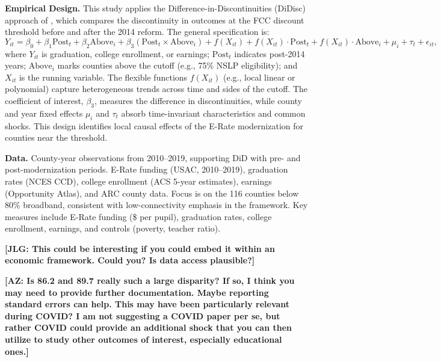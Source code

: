 \textbf{Empirical Design.} This study applies the Difference-in-Discontinuities (DiDisc) approach of \citet{grembiFiscalRulesMatter2016}, which compares the discontinuity in outcomes at the FCC discount threshold before and after the 2014 reform. The general specification is:
\[
Y_{it} = \beta_0 + \beta_1 \text{Post}_t + \beta_2 \text{Above}_i + \beta_3 (\text{Post}_t \times \text{Above}_i) 
+ f(X_{it}) + f(X_{it}) \cdot \text{Post}_t + f(X_{it}) \cdot \text{Above}_i 
+ \mu_i + \tau_t + \epsilon_{it},
\]
where $Y_{it}$ is graduation, college enrollment, or earnings; $\text{Post}_t$ indicates post-2014 years; $\text{Above}_i$ marks counties above the cutoff (e.g., 75\% NSLP eligibility); and $X_{it}$ is the running variable. The flexible functions $f(X_{it})$ (e.g., local linear or polynomial) capture heterogeneous trends across time and sides of the cutoff. The coefficient of interest, $\beta_3$, measures the difference in discontinuities, while county and year fixed effects $\mu_i$ and $\tau_t$ absorb time-invariant characteristics and common shocks. This design identifies local causal effects of the E-Rate modernization for counties near the threshold.


\textbf{Data.} County-year observations from 2010–2019, supporting DiD with pre- and post-modernization periods. E-Rate funding (USAC, 2010–2019), graduation rates (NCES CCD), college enrollment (ACS 5-year estimates), earnings (Opportunity Atlas), and ARC county data. Focus is on the 116 counties below 80\% broadband, consistent with low-connectivity emphasis in the framework. Key measures include E-Rate funding (\$ per pupil), graduation rates, college enrollment, earnings, and controls (poverty, teacher ratio).

\bigskip

\noindent \textbf{[JLG: This could be interesting if you could embed it within an economic framework. Could you? Is data access plausible?]}

\vspace{3em}

\noindent \textbf{[AZ: Is 86.2 and 89.7 really such a large disparity? If so, I think you may need to provide further documentation. Maybe reporting standard errors can help. This may have been particularly relevant during COVID? I am not suggesting a COVID paper per se, but rather COVID could provide an additional shock that you can then utilize to study other outcomes of interest, especially educational ones.]}








